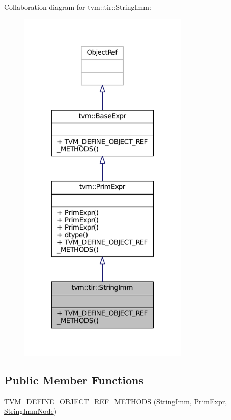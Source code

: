 Collaboration diagram for tvm\+:\+:tir\+:\+:String\+Imm\+:
\nopagebreak
\begin{figure}[H]
\begin{center}
\leavevmode
\includegraphics[width=230pt]{classtvm_1_1tir_1_1StringImm__coll__graph}
\end{center}
\end{figure}
\subsection*{Public Member Functions}
\begin{DoxyCompactItemize}
\item 
\hyperlink{classtvm_1_1tir_1_1StringImm_add0a6a94dcbc78a457952860f20edce8}{T\+V\+M\+\_\+\+D\+E\+F\+I\+N\+E\+\_\+\+O\+B\+J\+E\+C\+T\+\_\+\+R\+E\+F\+\_\+\+M\+E\+T\+H\+O\+DS} (\hyperlink{classtvm_1_1tir_1_1StringImm}{String\+Imm}, \hyperlink{classtvm_1_1PrimExpr}{Prim\+Expr}, \hyperlink{classtvm_1_1tir_1_1StringImmNode}{String\+Imm\+Node})
\end{DoxyCompactItemize}


